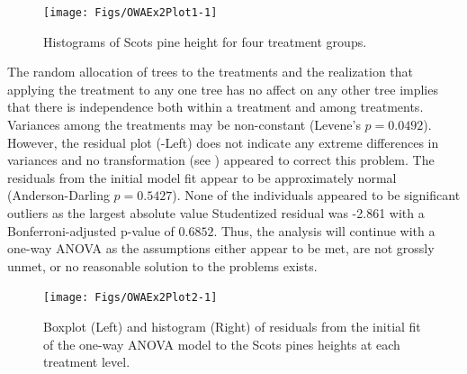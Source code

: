 \documentclass[10pt,openany]{book}\usepackage[]{graphicx}\usepackage[]{color}
\newenvironment{knitrout}{}{} %
\begin{document}
\begin{knitrout}
\color{fgcolor}\begin{figure}[hbtp]

{\centering \texttt{[image: Figs/OWAEx2Plot1-1]} 

}

\caption[Histograms of Scots pine height for four treatment groups]{Histograms of Scots pine height for four treatment groups.}\label{fig:OWAEx2Plot1}
\end{figure}


\end{knitrout}



The random allocation of trees to the treatments and the realization that applying the treatment to any one tree has no affect on any other tree implies that there is independence both within a treatment and among treatments.  Variances among the treatments may be non-constant (Levene's $p=0.0492$).  However, the residual plot (-Left) does not indicate any extreme differences in variances and no transformation (see ) appeared to correct this problem.  The residuals from the initial model fit appear to be approximately normal (Anderson-Darling $p=0.5427$).  None of the individuals appeared to be significant outliers as the largest absolute value Studentized residual was -2.861 with a Bonferroni-adjusted p-value of $0.6852$.  Thus, the analysis will continue with a one-way ANOVA as the assumptions either appear to be met, are not grossly unmet, or no reasonable solution to the problems exists.

\begin{knitrout}
\color{fgcolor}\begin{figure}[hbtp]

{\centering \texttt{[image: Figs/OWAEx2Plot2-1]} 

}

\caption[Boxplot (Left) and histogram (Right) of residuals from the initial fit of the one-way ANOVA model to the Scots pines heights at each treatment level]{Boxplot (Left) and histogram (Right) of residuals from the initial fit of the one-way ANOVA model to the Scots pines heights at each treatment level.}\label{fig:OWAEx2Plot2}
\end{figure}


\end{knitrout}
\end{document}
